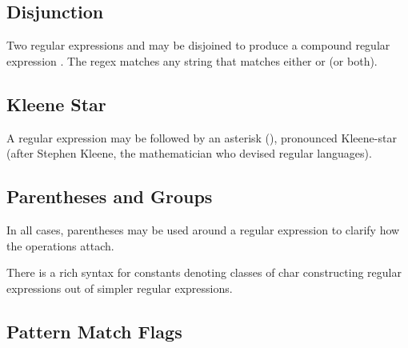 \subsection{Disjunction}

Two regular expressions  and  may be disjoined
to produce a compound regular expression
\code{|}.  The regex
\code{|} matches any string that matches either
 or  (or both).


\subsection{Kleene Star}

A regular expression may be followed by an asterisk (\code{*}),
pronounced Kleene-star (after Stephen Kleene, the mathematician who
devised regular languages).






\subsection{Parentheses and Groups}

In all cases, parentheses may be used around a regular expression to
clarify how the operations attach.




There is a rich syntax for constants denoting classes of char
constructing regular expressions out of
simpler regular expressions.

\subsection{Pattern Match Flags}\label{section:pattern-modes}

